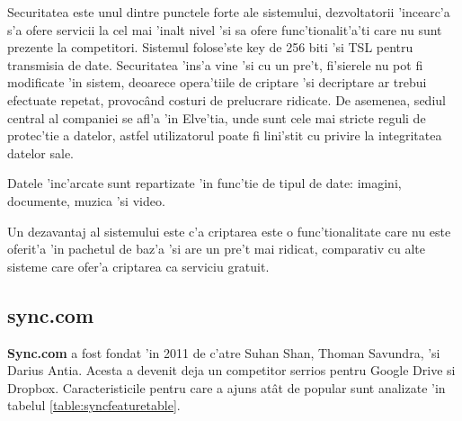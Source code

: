 \documentclass[12pt,a4paper,twoside]{report}
\begin{document}
Securitatea este unul dintre punctele forte ale sistemului, dezvoltatorii 'incearc'a s'a ofere servicii la cel mai 'inalt nivel 'si sa ofere func'tionalit'a'ti care nu sunt prezente la competitori. Sistemul folose'ste key de 256 biti 'si TSL pentru transmisia de date. Securitatea 'ins'a vine 'si cu un pre't, fi'sierele nu pot fi modificate 'in sistem, deoarece opera'tiile de criptare 'si decriptare ar trebui efectuate repetat, provocând costuri de prelucrare ridicate. De asemenea, sediul central al companiei se afl'a 'in Elve'tia, unde sunt cele mai stricte reguli de protec'tie a datelor, astfel utilizatorul poate fi lini'stit cu privire la integritatea datelor sale.

Datele 'inc'arcate sunt repartizate 'in func'tie de tipul de date: imagini, documente, muzica 'si video.

Un dezavantaj al sistemului este c'a criptarea este o func'tionalitate care nu este oferit'a 'in pachetul de baz'a 'si are un pre't mai ridicat, comparativ cu  alte sisteme care ofer'a criptarea ca serviciu gratuit.



\subsection{sync.com}
\textbf{Sync.com} a fost fondat 'in 2011 de c'atre Suhan Shan, Thoman Savundra, 'si Darius Antia. Acesta a devenit deja un competitor serrios pentru Google Drive si Dropbox. Caracteristicile pentru care a ajuns atât de popular sunt analizate 'in tabelul \ref{table:syncfeaturetable}.
\end{document}
